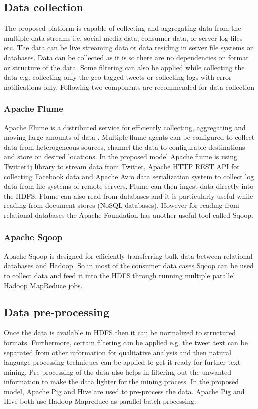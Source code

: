 \subsection{Data collection}
The proposed platform is capable of collecting and aggregating data from the multiple data streams i.e. social media data, consumer data, or server log files etc. The data can be live streaming data or data residing in server file systems or databases. Data can be collected as it is so there are no dependencies on format or structure of the data. Some filtering can also be applied while collecting the data e.g. collecting only the geo tagged tweets or collecting logs with error notifications only. Following two components are recommended for data collection
\subsubsection{Apache Flume}
Apache Flume is a distributed service for efficiently collecting, aggregating and moving large amounts of data \cite{flume}. Multiple flume agents can be configured to collect data from heterogeneous sources, channel the data to configurable destinations and store on desired locations. In the proposed model Apache flume is using Twitter4j library to stream data from Twitter, Apache HTTP REST API for collecting Facebook data and Apache Avro\cite{avro} data serialization system to collect log data from file systems of remote servers. Flume can then ingest data directly into the HDFS. Flume can also read from databases and it is particularly useful while reading from document stores (NoSQL databases). However for reading from relational databases the Apache Foundation has another useful tool called Sqoop.
\subsubsection{Apache Sqoop}
Apache Sqoop \cite{sqoop} is designed for efficiently transferring bulk data between relational databases and Hadoop. So in most of the consumer data cases Sqoop can be used to collect data and feed it into the HDFS through running multiple parallel Hadoop MapReduce jobs.
\subsection{Data pre-processing}
Once the data is available in HDFS then it can be normalized to structured formats. Furthermore, certain filtering can be applied e.g. the tweet text can be separated from other information for qualitative analysis and then natural language processing techniques can be applied to get it ready for further text mining. Pre-processing of the data also helps in filtering out the unwanted information to make the data lighter for the mining process. In the proposed model, Apache Pig and Hive are used to pre-process the data. Apache Pig and Hive both use Hadoop Mapreduce as parallel batch processing. 

